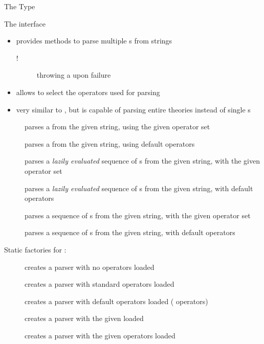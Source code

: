 \documentclass[handout]{beamer}
\begin{document}
\begin{frame}[allowframebreaks]{The  Type}
    \begin{block}{The  interface}
        \begin{itemize}
            \item provides methods to parse multiple s from strings
            \begin{description}
                \item[!] throwing a  upon failure 
            \end{description}
            \item allows to select the operators used for parsing
            \item very similar to , but is capable of parsing entire theories instead of single s
        \end{itemize}
    \end{block}
    \begin{description}
        \item [] parses a  from the given string, using the given operator set
        \item [] parses a  from the given string, using default operators
        \item [] parses a \textit{lazily evaluated} sequence of s from the given string, with the given operator set
        \item [] parses a \textit{lazily evaluated} sequence of s from the given string, with default operators
        \item [] parses a sequence of s from the given string, with the given operator set
        \item [] parses a sequence of s from the given string, with default operators
    \end{description}

    \framebreak

    Static factories for :
    \begin{description}
        \item [] creates a parser with no operators loaded
        \item [] creates a parser with standard operators loaded
        \item [] creates a parser with default operators loaded ( operators)
        \item [] creates a parser with the given  loaded
        \item [] creates a parser with the given operators loaded
    \end{description}


\end{frame}
\end{document}
